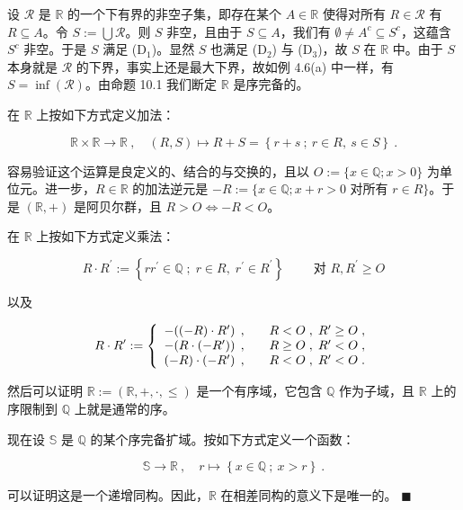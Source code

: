 \begin{theorem}
设 $ \mathcal{R} $ 是 $ \mathbb{R} $ 的一个下有界的非空子集，即存在某个 $ A \in \mathbb{R} $ 使得对所有 $ R \in \mathcal{R} $ 有 $ R \subseteq A $。令 $ S := \bigcup \mathcal{R} $。则 $ S $ 非空，且由于 $ S \subseteq A $，我们有 $ \emptyset \neq A^c \subseteq S^c $，这蕴含 $ S^c $ 非空。于是 $ S $ 满足 (D$_1$)。显然 $ S $ 也满足 (D$_2$) 与 (D$_3$)，故 $ S $ 在 $ \mathbb{R} $ 中。由于 $ S $ 本身就是 $ \mathcal{R} $ 的下界，事实上还是最大下界，故如例 4.6(a) 中一样，有 $ S = \inf(\mathcal{R}) $。由命题 10.1 我们断定 $ \mathbb{R} $ 是序完备的。

在 $ \mathbb{R} $ 上按如下方式定义加法：

\[
\mathbb{R}\times\mathbb{R}\to\mathbb{R}~,\quad(R,S)\mapsto R+S=\left\{r+s~;~r\in R,~s\in S\right\}~.
\]

容易验证这个运算是良定义的、结合的与交换的，且以 $ O := \{x \in \mathbb{Q} ; x > 0\} $ 为单位元。进一步，$ R \in \mathbb{R} $ 的加法逆元是 $ -R := \{x \in \mathbb{Q} ; x + r > 0 \text{ 对所有 } r \in R\} $。于是 $ (\mathbb{R}, +) $ 是阿贝尔群，且 $ R > O \Leftrightarrow -R < O $。

在 $ \mathbb{R} $ 上按如下方式定义乘法：

\[
R\cdot R^{\prime}:=\left\{r r^{\prime}\in\mathbb{Q}\;;\;r\in R,\;r^{\prime}\in R^{\prime}\right\}\qquad\text{ 对 }R,R^{\prime}\geq O
\]

以及

\begin{equation*}
R\cdot R^{\prime}:=\left\{\begin{array}{l l}-{\left(\left(-R\right)\cdot R^{\prime}\right)\;,}&\quad R<O\;,\;R^{\prime}\geq O\;,\\ -{\left(R\cdot\left(-R^{\prime}\right)\right)\;,}&\quad R\geq O\;,\;R^{\prime}<O\;,\\ {\left(-R\right)\cdot\left(-R^{\prime}\right)\;,}&\quad R<O\;,\;R^{\prime}<O\;.\\ \end{array}\right.
\end{equation*}

然后可以证明 $ \mathbb{R} := (\mathbb{R}, +, \cdot, \leq) $ 是一个有序域，它包含 $ \mathbb{Q} $ 作为子域，且 $ \mathbb{R} $ 上的序限制到 $ \mathbb{Q} $ 上就是通常的序。

现在设 $ \mathbb{S} $ 是 $ \mathbb{Q} $ 的某个序完备扩域。按如下方式定义一个函数：

\[
\mathbb{S}\to\mathbb{R}~,\quad r\mapsto\left\{x\in\mathbb{Q}~;~x>r\right\}~.
\]

可以证明这是一个递增同构。因此，$ \mathbb{R} $ 在相差同构的意义下是唯一的。 $ \blacksquare $

\end{theorem}

